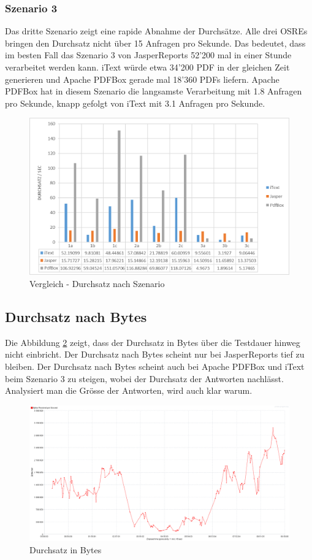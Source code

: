 \documentclass[main.tex]{subfiles}
\begin{document}
\subsubsection{Szenario 3}
Das dritte Szenario zeigt eine rapide Abnahme der Durchsätze. Alle drei OSREs bringen den Durchsatz nicht über 15 Anfragen pro Sekunde. Das bedeutet, dass im besten Fall das Szenario 3 von JasperReports 52'200 mal in einer Stunde verarbeitet werden kann. iText würde etwa 34'200 PDF in der gleichen Zeit generieren und Apache PDFBox gerade mal 18'360 PDFs liefern. 
Apache PDFBox hat in diesem Szenario die langsamste Verarbeitung mit 1.8 Anfragen pro Sekunde, knapp gefolgt von iText mit 3.1 Anfragen pro Sekunde. 

\begin{figure}[!ht]
\includegraphics[width=\textwidth]{mainpart/4_analyse_img/VglDurchSzen.png}
 \caption{Vergleich - Durchsatz nach Szenario}
 \label{figure:throughputSzen}
\end{figure}

\subsection{Durchsatz nach Bytes}
Die Abbildung \ref{figure:throughputBytesAll} zeigt, dass der Durchsatz in Bytes über die Testdauer hinweg nicht einbricht. Der Durchsatz nach Bytes scheint nur bei JasperReports tief zu bleiben. Der Durchsatz nach Bytes scheint auch bei Apache PDFBox und iText beim Szenario 3 zu steigen,  wobei der Durchsatz der Antworten nachlässt. Analysiert man die Grösse der Antworten, wird auch klar warum. 
\begin{figure}[!h]
\includegraphics[width=\textwidth]{mainpart/4_analyse_img/ThroughputOverTimeAll.png}
 \caption{Durchsatz in Bytes}
 \label{figure:throughputBytesAll}
\end{figure}
\end{document}
